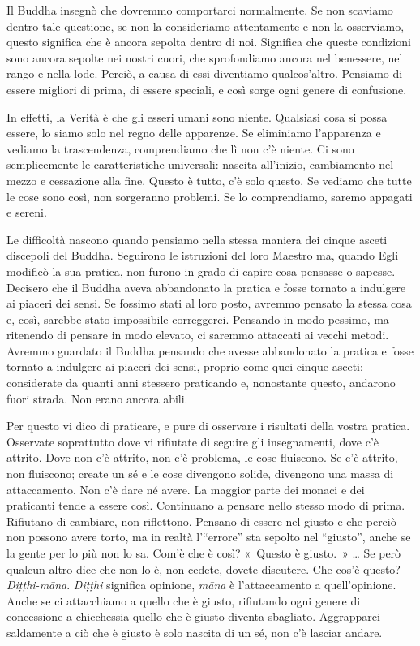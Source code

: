 Il Buddha insegnò che dovremmo comportarci normalmente. Se non scaviamo
dentro tale questione, se non la consideriamo attentamente e non la
osserviamo, questo significa che è ancora sepolta dentro di noi.
Significa che queste condizioni sono ancora sepolte nei nostri cuori,
che sprofondiamo ancora nel benessere, nel rango e nella lode. Perciò, a
causa di essi diventiamo qualcos'altro. Pensiamo di essere migliori di
prima, di essere speciali, e così sorge ogni genere di confusione.

In effetti, la Verità è che gli esseri umani sono niente. Qualsiasi cosa
si possa essere, lo siamo solo nel regno delle apparenze. Se eliminiamo
l'apparenza e vediamo la trascendenza, comprendiamo che lì non c'è
niente. Ci sono semplicemente le caratteristiche universali: nascita
all'inizio, cambiamento nel mezzo e cessazione alla fine. Questo è
tutto, c'è solo questo. Se vediamo che tutte le cose sono così, non
sorgeranno problemi. Se lo comprendiamo, saremo appagati e sereni.

Le difficoltà nascono quando pensiamo nella stessa maniera dei cinque
asceti discepoli del Buddha. Seguirono le istruzioni del loro Maestro
ma, quando Egli modificò la sua pratica, non furono in grado di capire
cosa pensasse o sapesse. Decisero che il Buddha aveva abbandonato la
pratica e fosse tornato a indulgere ai piaceri dei sensi. Se fossimo
stati al loro posto, avremmo pensato la stessa cosa e, così, sarebbe
stato impossibile correggerci. Pensando in modo pessimo, ma ritenendo di
pensare in modo elevato, ci saremmo attaccati ai vecchi metodi. Avremmo
guardato il Buddha pensando che avesse abbandonato la pratica e fosse
tornato a indulgere ai piaceri dei sensi, proprio come quei cinque
asceti: considerate da quanti anni stessero praticando e, nonostante
questo, andarono fuori strada. Non erano ancora abili.

Per questo vi dico di praticare, e pure di osservare i risultati della
vostra pratica. Osservate soprattutto dove vi rifiutate di seguire gli
insegnamenti, dove c'è attrito. Dove non c'è attrito, non c'è problema,
le cose fluiscono. Se c'è attrito, non fluiscono; create un sé e le cose
divengono solide, divengono una massa di attaccamento. Non c'è dare né
avere. La maggior parte dei monaci e dei praticanti tende a essere così.
Continuano a pensare nello stesso modo di prima. Rifiutano di cambiare,
non riflettono. Pensano di essere nel giusto e che perciò non possono
avere torto, ma in realtà l'``errore'' sta sepolto nel ``giusto'', anche
se la gente per lo più non lo sa. Com'è che è così? «~Questo è giusto.~»
\ldots{} Se però qualcun altro dice che non lo è, non cedete, dovete
discutere. Che cos'è questo? \emph{Diṭṭhi-māna}. \emph{Diṭṭhi} significa
opinione, \emph{māna} è l'attaccamento a quell'opinione. Anche se ci
attacchiamo a quello che è giusto, rifiutando ogni genere di concessione
a chicchessia quello che è giusto diventa sbagliato. Aggrapparci
saldamente a ciò che è giusto è solo nascita di un sé, non c'è lasciar
andare.

